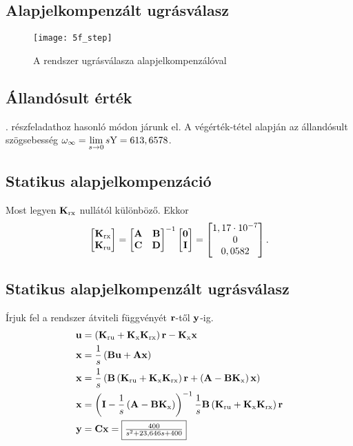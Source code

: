 
\subsection{Alapjelkompenzált ugrásválasz}

\begin{figure}[H]
	\centering
	\texttt{[image: 5f\_step]}
	\caption{A rendszer ugrásválasza alapjelkompenzálóval}
	\label{fig:5f_step}
\end{figure}


\subsection{Állandósult érték}

. részfeladathoz hasonló módon járunk el.
A végérték-tétel alapján az állandósult szögsebesség $\omega_\infty = \lim\limits_{s\rightarrow 0}s\fn{Y} = 613,6578$.


\subsection{Statikus alapjelkompenzáció}

Most legyen $\B{K}_\text{rx}$ nullától különböző.
Ekkor
\begin{equation}
	\mat{\B{K}_\text{rx}\\\B{K}_\text{ru}}=\mat{\B{A}&\B{B}\\\B{C}&\B{D}}^{-1}\mat{\B{0}\\\B{I}}
	= \mat{1,17\cdot10^{-7}\\0\\0,0582}.
\end{equation}


\subsection{Statikus alapjelkompenzált ugrásválasz}

Írjuk fel a rendszer átviteli függvényét $\B{r}$-től $\B{y}$-ig.
\begin{align}
	\B{u} &= \brc{\B{K}_\text{ru}+\B{K}_\text{x}\B{K}_\text{rx}}\B{r} - \B{K}_\text{x}\B{x}\\
	\B{x} &= \frac{1}{s}\brc{\B{B}\B{u} + \B{A}\B{x}}\\
	\B{x} &= \frac{1}{s}\brc{\B{B}\brc{\B{K}_\text{ru}+\B{K}_\text{x}\B{K}_\text{rx}}\B{r}+\brc{\B{A}-\B{B}\B{K}_\text{x}}\B{x}}\\
	\B{x} &= \brc{\B{I}-\frac{1}{s}\brc{\B{A}-\B{B}\B{K}_\text{x} }}^{-1}\frac{1}{s}\B{B}\brc{\B{K}_\text{ru}+\B{K}_\text{x}\B{K}_\text{rx}}\B{r}\\
	\B{y} &= \B{C}\B{x} = \fbox{$\frac{400}{s^2 + 23,646 s + 400}$}
\end{align}

